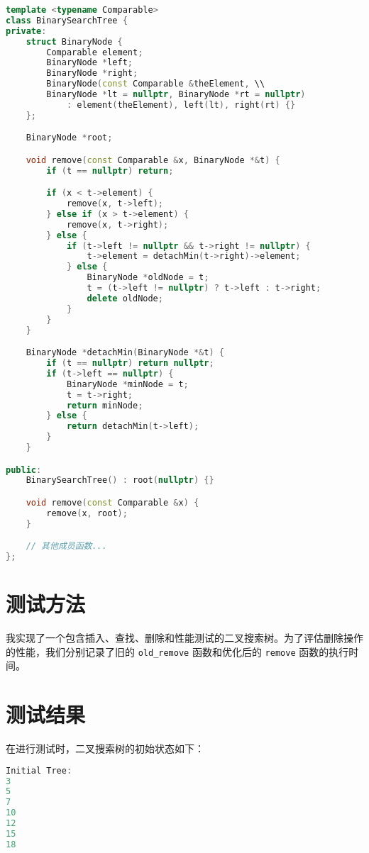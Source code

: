 \documentclass{article}
\begin{document}
\begin{lstlisting}[language=C++]
template <typename Comparable>
class BinarySearchTree {
private:
    struct BinaryNode {
        Comparable element;
        BinaryNode *left;
        BinaryNode *right;
        BinaryNode(const Comparable &theElement, \\
        BinaryNode *lt = nullptr, BinaryNode *rt = nullptr)
            : element(theElement), left(lt), right(rt) {}
    };

    BinaryNode *root;

    void remove(const Comparable &x, BinaryNode *&t) {
        if (t == nullptr) return;

        if (x < t->element) {
            remove(x, t->left);
        } else if (x > t->element) {
            remove(x, t->right);
        } else {
            if (t->left != nullptr && t->right != nullptr) {
                t->element = detachMin(t->right)->element;
            } else {
                BinaryNode *oldNode = t;
                t = (t->left != nullptr) ? t->left : t->right;
                delete oldNode;
            }
        }
    }

    BinaryNode *detachMin(BinaryNode *&t) {
        if (t == nullptr) return nullptr;
        if (t->left == nullptr) {
            BinaryNode *minNode = t;
            t = t->right;
            return minNode;
        } else {
            return detachMin(t->left);
        }
    }

public:
    BinarySearchTree() : root(nullptr) {}

    void remove(const Comparable &x) {
        remove(x, root);
    }

    // 其他成员函数...
};
\end{lstlisting}

\section{测试方法}
我实现了一个包含插入、查找、删除和性能测试的二叉搜索树。为了评估删除操作的性能，我们分别记录了旧的 \texttt{old\_remove} 函数和优化后的 \texttt{remove} 函数的执行时间。

\section{测试结果}
在进行测试时，二叉搜索树的初始状态如下：

\begin{lstlisting}[language=C++]
Initial Tree:
3
5
7
10
12
15
18
\end{lstlisting}
\end{document}
